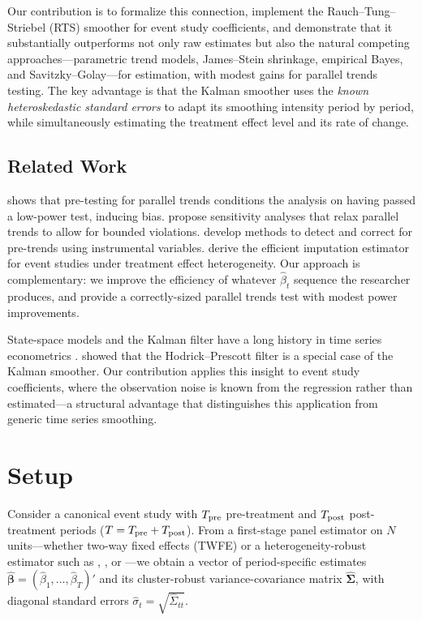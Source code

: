 \documentclass[12pt]{article}
\begin{document}
Our contribution is to formalize this connection, implement the Rauch--Tung--Striebel (RTS) smoother for event study coefficients, and demonstrate that it substantially outperforms not only raw estimates but also the natural competing approaches---parametric trend models, James--Stein shrinkage, empirical Bayes, and Savitzky--Golay---for estimation, with modest gains for parallel trends testing. The key advantage is that the Kalman smoother uses the \emph{known heteroskedastic standard errors} to adapt its smoothing intensity period by period, while simultaneously estimating the treatment effect level and its rate of change.

\subsection{Related Work}

\citet{roth2022pretest} shows that pre-testing for parallel trends conditions the analysis on having passed a low-power test, inducing bias. \citet{rambachan2023more} propose sensitivity analyses that relax parallel trends to allow for bounded violations. \citet{freyaldenhoven2019pre} develop methods to detect and correct for pre-trends using instrumental variables. \citet{borusyak2024revisiting} derive the efficient imputation estimator for event studies under treatment effect heterogeneity. Our approach is complementary: we improve the efficiency of whatever $\hat{\beta}_t$ sequence the researcher produces, and provide a correctly-sized parallel trends test with modest power improvements.

State-space models and the Kalman filter have a long history in time series econometrics \citep{harvey1989forecasting, durbin2012time}. \citet{harvey1985trends} showed that the Hodrick--Prescott filter is a special case of the Kalman smoother. Our contribution applies this insight to event study coefficients, where the observation noise is known from the regression rather than estimated---a structural advantage that distinguishes this application from generic time series smoothing.

\section{Setup}

Consider a canonical event study with $T_{\rm pre}$ pre-treatment and $T_{\rm post}$ post-treatment periods ($T = T_{\rm pre} + T_{\rm post}$). From a first-stage panel estimator on $N$ units---whether two-way fixed effects (TWFE) or a heterogeneity-robust estimator such as \citet{callaway2021difference}, \citet{sun2021estimating}, or \citet{borusyak2024revisiting}---we obtain a vector of period-specific estimates $\hat{\boldsymbol\beta} = (\hat{\beta}_1, \ldots, \hat{\beta}_T)'$ and its cluster-robust variance-covariance matrix $\widehat{\boldsymbol\Sigma}$, with diagonal standard errors $\hat{\sigma}_t = \sqrt{\widehat{\Sigma}_{tt}}$.
\end{document}
